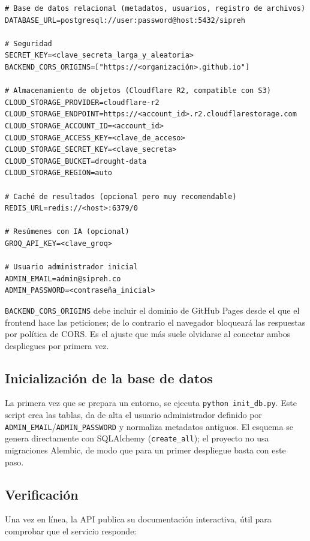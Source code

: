 \begin{verbatim}
# Base de datos relacional (metadatos, usuarios, registro de archivos)
DATABASE_URL=postgresql://user:password@host:5432/sipreh

# Seguridad
SECRET_KEY=<clave_secreta_larga_y_aleatoria>
BACKEND_CORS_ORIGINS=["https://<organización>.github.io"]

# Almacenamiento de objetos (Cloudflare R2, compatible con S3)
CLOUD_STORAGE_PROVIDER=cloudflare-r2
CLOUD_STORAGE_ENDPOINT=https://<account_id>.r2.cloudflarestorage.com
CLOUD_STORAGE_ACCOUNT_ID=<account_id>
CLOUD_STORAGE_ACCESS_KEY=<clave_de_acceso>
CLOUD_STORAGE_SECRET_KEY=<clave_secreta>
CLOUD_STORAGE_BUCKET=drought-data
CLOUD_STORAGE_REGION=auto

# Caché de resultados (opcional pero muy recomendable)
REDIS_URL=redis://<host>:6379/0

# Resúmenes con IA (opcional)
GROQ_API_KEY=<clave_groq>

# Usuario administrador inicial
ADMIN_EMAIL=admin@sipreh.co
ADMIN_PASSWORD=<contraseña_inicial>
\end{verbatim}

\begin{remark}
\texttt{BACKEND\_CORS\_ORIGINS} debe incluir el dominio de GitHub Pages desde el que el frontend hace las peticiones; de lo contrario el navegador bloqueará las respuestas por política de CORS. Es el ajuste que más suele olvidarse al conectar ambos despliegues por primera vez.
\end{remark}

\subsection*{Inicialización de la base de datos}

La primera vez que se prepara un entorno, se ejecuta \texttt{python init\_db.py}. Este script crea las tablas, da de alta el usuario administrador definido por \texttt{ADMIN\_EMAIL}/\texttt{ADMIN\_PASSWORD} y normaliza metadatos antiguos. El esquema se genera directamente con SQLAlchemy (\texttt{create\_all}); el proyecto no usa migraciones Alembic, de modo que para un primer despliegue basta con este paso.

\subsection*{Verificación}

Una vez en línea, la API publica su documentación interactiva, útil para comprobar que el servicio responde:

